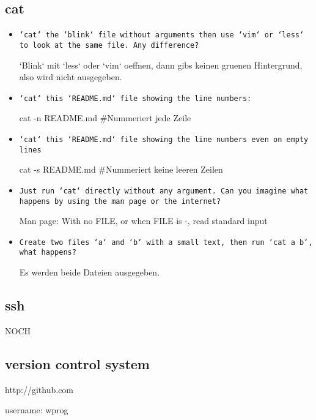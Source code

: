 \documentclass[10pt,a4paper]{scrartcl}
\begin{document}
\subsection{cat}

\begin{itemize}

\item \texttt{`cat` the `blink` file without arguments then use `vim` or `less` to look at the same file. Any difference?}


`Blink` mit `less` oder `vim` oeffnen, dann gibs keinen gruenen Hintergrund, also wird nicht ausgegeben.


\item \texttt{`cat` this `README.md` file showing the line numbers:}
\begin{terminalcode}
cat -n README.md	#Nummeriert jede Zeile
\end{terminalcode}

\item \texttt{`cat` this `README.md` file showing the line numbers even on empty lines
}

\begin{terminalcode}
cat -s README.md	#Nummeriert keine leeren Zeilen
\end{terminalcode}

\item \texttt{Just run `cat` directly without any argument. Can you imagine what happens by using the man page or the internet?}

Man page: With no FILE, or when FILE is -, read standard input

\item \texttt{Create two files `a` and `b` with a small text, then run `cat a b`, what happens?}

Es werden beide Dateien ausgegeben.
\end{itemize}
\subsection{ssh}

NOCH

\subsection{version control system}

http://github.com


username: wprog
\end{document}
